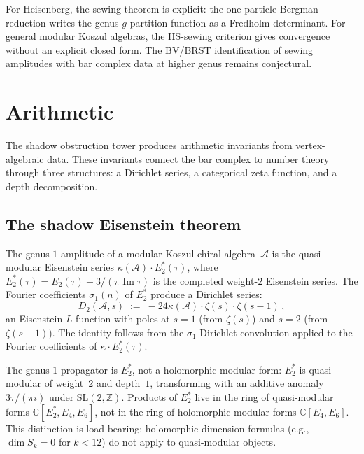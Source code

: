 \documentclass[11pt,reqno]{amsart}
\theoremstyle{definition}
\theoremstyle{remark}
\newcommand{\cA}{\mathcal{A}}
\numberwithin{equation}{section}
\begin{document}
For Heisenberg, the sewing theorem is explicit: the
one-particle Bergman reduction writes the genus-$g$
partition function as a Fredholm determinant. For general
modular Koszul algebras, the HS-sewing criterion gives
convergence without an explicit closed form. The BV/BRST
identification of sewing amplitudes with bar complex
data at higher genus remains conjectural.


\section{Arithmetic}
\label{sec:arithmetic}

The shadow obstruction tower produces arithmetic invariants
from vertex-algebraic data. These invariants connect the
bar complex to number theory through three structures: a
Dirichlet series, a categorical zeta function, and a depth
decomposition.

\subsection{The shadow Eisenstein theorem}
\label{ssec:eisenstein}

The genus-$1$ amplitude of a modular Koszul chiral
algebra~$\cA$ is the quasi-modular Eisenstein series
$\kappa(\cA) \cdot E_2^*(\tau)$, where
$E_2^*(\tau) = E_2(\tau) - 3/(\pi \operatorname{Im}\tau)$
is the completed weight-$2$ Eisenstein series. The
Fourier coefficients $\sigma_1(n)$ of $E_2^*$ produce
a Dirichlet series:
\begin{equation}\label{eq:dirichlet-series}
D_2(\cA, s)
\;:=\;
-24\kappa(\cA) \cdot
\zeta(s) \cdot \zeta(s - 1)\,,
\end{equation}
an Eisenstein $L$-function with poles at $s = 1$ (from
$\zeta(s)$) and $s = 2$ (from $\zeta(s-1)$). The identity
follows from the $\sigma_1$ Dirichlet convolution applied to
the Fourier coefficients of $\kappa \cdot E_2^*(\tau)$.

The genus-$1$ propagator is $E_2^*$, not a holomorphic
modular form: $E_2^*$ is quasi-modular of weight~$2$ and
depth~$1$, transforming with an additive anomaly
$3\tau/(\pi i)$ under $\mathrm{SL}(2,\mathbb{Z})$.
Products of $E_2^*$ live in the ring of quasi-modular
forms $\mathbb{C}[E_2^*, E_4, E_6]$, not in the ring of
holomorphic modular forms $\mathbb{C}[E_4, E_6]$. This
distinction is load-bearing: holomorphic dimension formulas
(e.g., $\dim S_k = 0$ for $k < 12$) do not apply to
quasi-modular objects.
\end{document}
